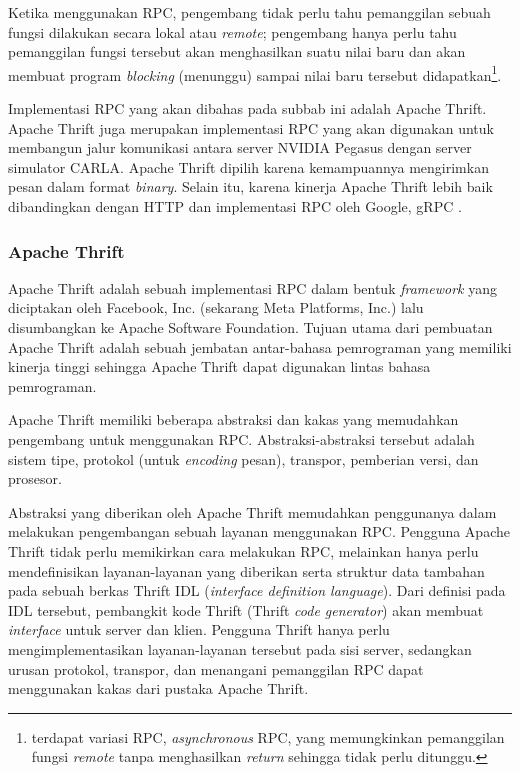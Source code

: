 Ketika menggunakan RPC, pengembang tidak perlu tahu pemanggilan sebuah fung\-si
dilakukan secara lokal atau \textit{remote}; pengembang hanya perlu tahu
pemanggilan fungsi tersebut akan menghasilkan suatu nilai baru dan akan membuat
program \textit{blocking} (menunggu) sampai nilai baru tersebut
didapatkan\footnote{terdapat variasi RPC, \textit{asynchronous} RPC, yang
    memungkinkan pemanggilan fungsi \textit{remote} tanpa menghasilkan
    \textit{return} sehingga tidak perlu ditunggu.}.

Implementasi RPC yang akan dibahas pada subbab ini adalah Apache Thrift.
Apa\-che Thrift juga merupakan implementasi RPC yang akan digunakan untuk
membangun jalur komunikasi antara server NVIDIA Pegasus dengan server simulator
CARLA. Apache Thrift dipilih karena kemampuannya mengirimkan pesan dalam format
\textit{binary}. Selain itu, karena kinerja Apache Thrift lebih baik
dibandingkan dengan HTTP dan implementasi RPC oleh Google, gRPC
\parencite{abernethy_buildingHighPerformanceMSThrift}.

\subsubsection{Apache Thrift}

Apache Thrift adalah sebuah implementasi RPC dalam bentuk \textit{framework}
yang diciptakan oleh Facebook, Inc. (sekarang Meta Platforms, Inc.) lalu
disumbangkan ke Apache Software Foundation. Tujuan utama dari pembuatan Apache
Thrift adalah sebuah jembatan antar-bahasa pemrograman yang memiliki kinerja
tinggi \parencite{agarwal_thrift} sehingga Apache Thrift dapat digunakan lintas
bahasa pemrograman.

Apache Thrift memiliki beberapa abstraksi dan kakas yang memudahkan pengembang
untuk menggunakan RPC. Abstraksi-abstraksi tersebut adalah sistem tipe, protokol
(untuk \textit{encoding} pesan), transpor, pemberian versi, dan prosesor.

Abstraksi yang diberikan oleh Apache Thrift memudahkan penggunanya dalam
me\-la\-ku\-kan pengembangan sebuah layanan menggunakan RPC. Pengguna Apache
Thrift tidak perlu memikirkan cara melakukan RPC, melainkan hanya perlu
men\-de\-fi\-ni\-si\-kan layanan-layanan yang diberikan serta struktur data
tambahan pada sebuah berkas Thrift IDL (\textit{interface definition language}).
Dari definisi pada IDL tersebut, pembangkit kode Thrift (Thrift \textit{code
    generator}) akan membuat \textit{interface} untuk server dan klien. Pengguna
Thrift hanya perlu mengimplementasikan layanan-layanan tersebut pada sisi
server, sedangkan urusan protokol, transpor, dan menangani pemanggilan RPC dapat
menggunakan kakas dari pustaka Apache Thrift.

